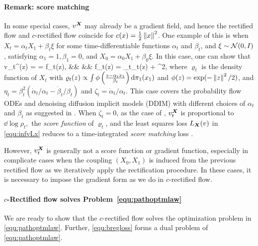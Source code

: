 \paragraph{Remark: score matching}
In some special cases,  $v^{{\boldsymbol{X}}}$ may already be a gradient field, 
and hence the rectified flow and $c$-rectified flow coincide for $c(x) = \frac{1}{2} \left\lVert x\right\rVert^2$. One example of this is when $X_t = \alpha_t X_1 + \beta_t \xi$ 
for some time-differentiable functions $\alpha_t$ and $\beta_t$, and $\xi \sim \mathcal{N}(0,I)$, satisfying $\alpha_1 = 1, \beta_1 = 0$, and $X_0 = \alpha_0 X_1 + \beta_0 \xi$. In this case, one can show that 
\bb 
v_t^\X(z) = 
\E[\dot \alpha_t X_1+\dot \beta_t X_0~|~X_t=z]
= \dd f_t(z),
&& &&
f_t(z) = 
\eta_t\log \varrho_t(z) +  ^2,
 \ee 
 where $\varrho_t$ is the density function of $X_t$ with  
 $\varrho_t(z) \propto \int \phi \left (
 \frac{z -\alpha_t x_1}{\beta_t}\right ) \mathrm{d} {\pi}_1(x_1)$ and $\phi(z) = \exp(-\left\lVert z\right\rVert^2/2)$, %
 and 
 $\eta_t = \beta_t^2 (\dot \alpha_t/\alpha_t - \dot \beta_t /\beta_t)$ and $\zeta_t = \dot \alpha_t /\alpha_t$.
 This case covers the probability flow ODEs \citep{song2020score} and denoising diffusion  implicit models (DDIM) \citep{song2020denoising}
 with different choices of $\alpha_t$ and $\beta_t$ %
 as suggested  in \cite{rectified}. 
 When $\zeta_t = 0$,
 as the case of \cite{song2019generative}, 
 $v_t^{{\boldsymbol{X}}}$ is proportional to $\dd\log \rho_t,$ the \emph{score function} of $\varrho_t$,
 and the least squares loss $L_{{\boldsymbol{X}}}(v)$ in \eqref{equ:infvLx} reduces to a time-integrated 
 \emph{score matching} loss \citep{hyvarinen2005estimation, vincent2011connection}. 

 However, 
 $v_t^{{\boldsymbol{X}}}$ is generally not a score function or gradient function, especially in complicate cases  when the coupling $(X_0,X_1)$ is induced from the previous rectified flow  as 
 we iteratively apply the rectification procedure.  
 In these cases, it is necessary to impose the gradient form as we do in $c$-rectified flow. %


\paragraph{$c$-Rectified flow solves Problem~\eqref{equ:pathoptmlaw}}
We are ready to show that the $c$-rectified flow solves the optimization problem in \eqref{equ:pathoptmlaw}. 
Further, \eqref{equ:bregloss} forms a dual problem of 
\eqref{equ:pathoptmlaw}. %

